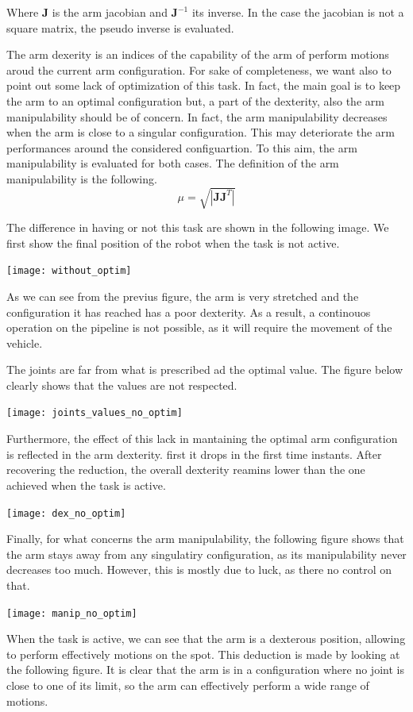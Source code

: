 \documentclass{article}
\begin{document}
Where $\bm{J}$ is the arm jacobian and $\bm{J}^{-1}$ its inverse. In the case the jacobian is not a square matrix, the pseudo inverse is evaluated. 

The arm dexerity is an indices of the capability of the arm of perform motions aroud the current arm configuration. 
For sake of completeness, we want also to point out some lack of optimization of this task. In fact, the main goal is to keep the arm to an optimal configuration but, a part of the dexterity, also the arm manipulability should be of concern. In fact, the arm manipulability decreases when the arm is close to a singular configuration. This may deteriorate the arm performances around the considered configuartion. To this aim, the arm manipulability is evaluated for both cases. The definition of the arm manipulability is the following. 
$$
	\mu = \sqrt{\left| \bm{J} \bm{J}^T \right|}
$$

The difference in having or not this task are shown in the following image. We first show the final position of the robot when the task is not active. 

\texttt{[image: without\_optim]}


As we can see from the previus figure, the arm is very stretched and the configuration it has reached has a poor dexterity. As a result, a continouos operation on the pipeline is not possible, as it will require the movement of the vehicle. 

The joints are far from what is prescribed ad the optimal value. The figure below clearly shows that the values are not respected. 

\texttt{[image: joints\_values\_no\_optim]}

Furthermore, the effect of this lack in mantaining the optimal arm configuration is reflected in the arm dexterity. first it drops in the first time instants. After recovering the reduction, the overall dexterity reamins lower than the one achieved when the task is active. 

\texttt{[image: dex\_no\_optim]}

Finally, for what concerns the arm manipulability, the following figure shows that the arm stays away from any singulatiry configuration, as its manipulability never decreases too much. However, this is mostly due to luck, as there no control on that. 

\texttt{[image: manip\_no\_optim]}

When the task is active, we can see that the arm is a dexterous position, allowing to perform effectively motions on the spot. This deduction is made by looking at the following figure. It is clear that the arm is in a configuration where no joint is close to one of its limit, so the arm can effectively perform a wide range of motions.
\end{document}
